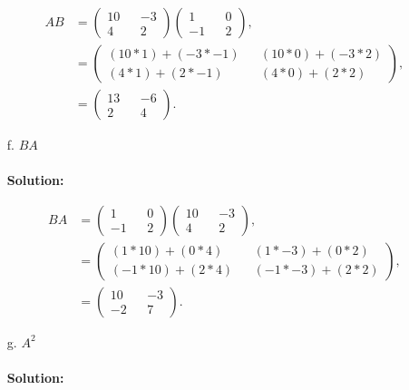 \documentclass[12pt]{article}
\makeatletter
\theoremstyle{homework}
\newenvironment{exercise}[1]
{\def\@currentlabel{#1}\exercisecore}
{\endexercisecore}
\makeatother
\begin{document}
\begin{exercise}{2}
\begin{enumerate}
  \begin{align*}
    AB &=
    \begin{pmatrix}
      10 && -3 \\
      4 && 2 
    \end{pmatrix}
    \begin{pmatrix}
      1 && 0 \\
      -1 && 2 
    \end{pmatrix},
    \\
    &=
    \begin{pmatrix}
      (10*1) + (-3*-1) && (10*0) + (-3*2) \\
      (4*1) + (2*-1) && (4*0) + (2*2)
    \end{pmatrix},
    \\
    &= \begin{pmatrix}
      13 && -6 \\
      2 && 4 
    \end{pmatrix}.
  \end{align*}

  \item[f.] $BA$\\\\
  \textbf{Solution:}

  \begin{align*}
    BA &=
    \begin{pmatrix}
      1 && 0 \\
      -1 && 2 
    \end{pmatrix}
    \begin{pmatrix}
      10 && -3 \\
      4 && 2 
    \end{pmatrix},
    \\
    &=
    \begin{pmatrix}
      (1*10) + (0*4) && (1*-3) + (0*2) \\
      (-1*10) + (2*4) && (-1*-3) + (2*2)
    \end{pmatrix},
    \\
    &= \begin{pmatrix}
      10 && -3 \\
      -2 && 7 
    \end{pmatrix}.
  \end{align*}


  \item[g.] $A^2$\\\\
  \textbf{Solution:}
  

\end{enumerate}
\end{exercise}
\end{document}
